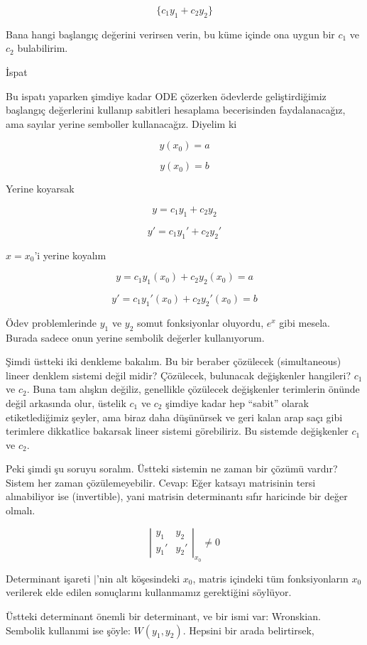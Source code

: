 \documentclass[12pt,fleqn]{article}\usepackage{../../common}
\begin{document}
$$ \bigg\{ c_1y_1 + c_2y_2 \bigg\} $$

Bana hangi başlangıç değerini verirsen verin, bu küme içinde ona uygun bir
$c_1$ ve $c_2$ bulabilirim. 

İspat

Bu ispatı yaparken şimdiye kadar ODE çözerken ödevlerde geliştirdiğimiz
başlangıç değerlerini kullanıp sabitleri hesaplama becerisinden
faydalanacağız, ama sayılar yerine semboller kullanacağız. Diyelim ki 

$$ y(x_0) = a $$

$$ y(x_0) = b $$

Yerine koyarsak

$$ y = c_1y_1 + c_2y_2 $$

$$ y' =  c_1y_1' + c_2y_2'$$

$x=x_0$'i yerine koyalım

$$ y = c_1y_1(x_0) + c_2y_2(x_0) = a$$

$$ y' =  c_1y_1'(x_0) + c_2y_2'(x_0) = b$$

Ödev problemlerinde $y_1$ ve $y_2$ somut fonksiyonlar oluyordu, $e^x$ gibi
mesela. Burada sadece onun yerine sembolik değerler kullanıyorum. 

Şimdi üstteki iki denkleme bakalım. Bu bir beraber çözülecek (simultaneous)
lineer denklem sistemi değil midir? Çözülecek, bulunacak değişkenler
hangileri? $c_1$ ve $c_2$. Buna tam alışkın değiliz, genellikle çözülecek
değişkenler terimlerin önünde değil arkasında olur, üstelik $c_1$ ve $c_2$
şimdiye kadar hep ``sabit'' olarak etiketlediğimiz şeyler, ama biraz daha
düşünürsek ve geri kalan arap saçı gibi terimlere dikkatlice bakarsak
lineer sistemi görebiliriz. Bu sistemde değişkenler $c_1$ ve $c_2$. 

Peki şimdi şu soruyu soralım. Üstteki sistemin ne zaman bir çözümü vardır?
Sistem her zaman çözülemeyebilir. Cevap: Eğer katsayı matrisinin tersi
alınabiliyor ise (invertible), yani matrisin determinantı sıfır haricinde
bir değer olmalı. 

$$ 
\left|\begin{array}{rr}
y_1 & y_2 \\
y_1' & y_2'
\end{array}\right|_{x_0}
\ne 0
$$

Determinant işareti $|$'nin alt köşesindeki $x_0$, matris içindeki tüm
fonksiyonların $x_0$ verilerek elde edilen sonuçlarını kullanmamız
gerektiğini söylüyor.  

Üstteki determinant önemli bir determinant, ve bir ismi var:
Wronskian. Sembolik kullanımi ise şöyle: $W(y_1, y_2)$. Hepsini bir arada
belirtirsek, 
\end{document}

